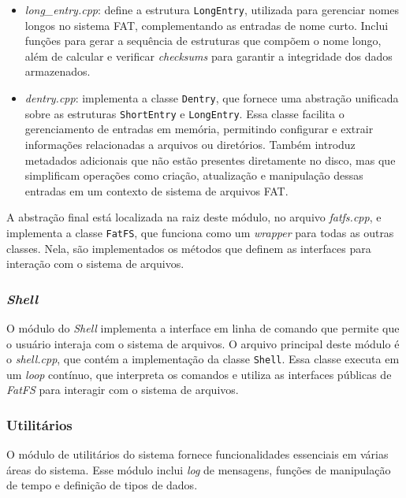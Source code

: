 \documentclass[
    12pt,				%
    oneside,   	        %
    a4paper,			%
    english,			%
    french,				%
    spanish,			%
    brazil,				%
    ]{pacotes/abntex2}
\begin{document}
\begin{itemize}
\begin{itemize}
        \item \textit{long\_entry.cpp}: define a estrutura \texttt{LongEntry}, utilizada para gerenciar nomes longos no sistema FAT, complementando as entradas de nome curto. Inclui funções para gerar a sequência de estruturas que compõem o nome longo, além de calcular e verificar \textit{checksums} para garantir a integridade dos dados armazenados.

        \item \textit{dentry.cpp}: implementa a classe \texttt{Dentry}, que fornece uma abstração unificada sobre as estruturas \texttt{ShortEntry} e \texttt{LongEntry}. Essa classe facilita o gerenciamento de entradas em memória, permitindo configurar e extrair informações relacionadas a arquivos ou diretórios. Também introduz metadados adicionais que não estão presentes diretamente no disco, mas que simplificam operações como criação, atualização e manipulação dessas entradas em um contexto de sistema de arquivos FAT.
    \end{itemize}
\end{itemize}

A abstração final está localizada na raiz deste módulo, no arquivo \textit{fatfs.cpp}, e implementa a classe \texttt{FatFS}, que funciona como um \textit{wrapper} para todas as outras classes. Nela, são implementados os métodos que definem as interfaces para interação com o sistema de arquivos.

\subsubsection{\textit{Shell}}
\label{subsubsec:shell}

O módulo do \textit{Shell} implementa a interface em linha de comando que permite que o usuário interaja com o sistema de arquivos. O arquivo principal deste módulo é o \textit{shell.cpp}, que contém a implementação da classe \texttt{Shell}. Essa classe executa em um \textit{loop} contínuo, que interpreta os comandos e utiliza as interfaces públicas de \textit{FatFS} para interagir com o sistema de arquivos.

\subsubsection{Utilitários}
\label{subsubsec:utils}

O módulo de utilitários do sistema fornece funcionalidades essenciais em várias áreas do sistema. Esse módulo inclui \textit{log} de mensagens, funções de manipulação de tempo e definição de tipos de dados.
\end{document}

